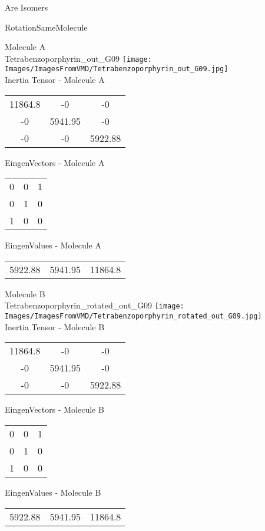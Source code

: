 \begin{center}
\vtab
\vtab
\textcolor{NavyBlue}{\Large Are Isomers}
\end{center}
\newpage

\vtab[-2cm]
\begin{center}
{\large RotationSameMolecule}
\end{center}
\begin{multicols}{2}
\begin{center}
Molecule A \\ 
Tetrabenzoporphyrin\_out\_G09
\texttt{[image: Images/ImagesFromVMD/Tetrabenzoporphyrin\_out\_G09.jpg]}
\\
Inertia Tensor - Molecule A \\
\vtab
\begin{tabular}{|c c c|}
11864.8	 & 	-0	 & 	-0	 \\
-0	 & 	5941.95	 & 	-0	 \\
-0	 & 	-0	 & 	5922.88
\end{tabular}

\vtab
 EingenVectors - Molecule A     \\
\vtab
\begin{tabular}{|c c c|}
0	 & 	0	 & 	1	 \\
0	 & 	1	 & 	0	 \\
1	 & 	0	 & 	0
\end{tabular}

\vtab
 EingenValues - Molecule A     \\
\vtab
\begin{tabular}{|c c c|}
5922.88	 & 	5941.95	 & 	11864.8
\end{tabular}
\columnbreak

Molecule B \\ 
Tetrabenzoporphyrin\_rotated\_out\_G09
\texttt{[image: Images/ImagesFromVMD/Tetrabenzoporphyrin\_rotated\_out\_G09.jpg]}
\\
Inertia Tensor - Molecule B \\
\vtab
\begin{tabular}{|c c c|}
11864.8	 & 	-0	 & 	-0	 \\
-0	 & 	5941.95	 & 	-0	 \\
-0	 & 	-0	 & 	5922.88
\end{tabular}

\vtab
 EingenVectors - Molecule B     \\
\vtab
\begin{tabular}{|c c c|}
0	 & 	0	 & 	1	 \\
0	 & 	1	 & 	0	 \\
1	 & 	0	 & 	0
\end{tabular}

\vtab
 EingenValues - Molecule B     \\
\vtab
\begin{tabular}{|c c c|}
5922.88	 & 	5941.95	 & 	11864.8
\end{tabular}

\end{center}
\end{multicols}
